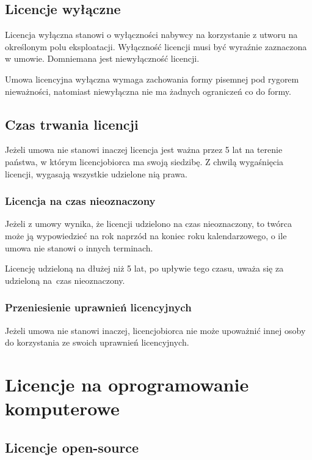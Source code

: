 \documentclass{article}
\begin{document}
\subsection{Licencje wyłączne}

Licencja wyłączna stanowi o wyłączności nabywcy na korzystanie z utworu na określonym polu eksploatacji. Wyłączność licencji musi być wyraźnie zaznaczona w umowie. Domniemana jest niewyłączność licencji.

Umowa licencyjna wyłączna wymaga zachowania formy pisemnej pod rygorem nieważności, natomiast niewyłączna nie ma żadnych ograniczeń co do formy.

\subsection{Czas trwania licencji}

Jeżeli umowa nie stanowi inaczej licencja jest ważna przez 5 lat na terenie państwa, w którym licencjobiorca ma swoją siedzibę. Z chwilą wygaśnięcia licencji, wygasają wszystkie udzielone nią prawa.

\subsubsection{Licencja na czas nieoznaczony}

Jeżeli z umowy wynika, że licencji udzielono na czas nieoznaczony, to twórca może ją wypowiedzieć na rok naprzód na koniec roku kalendarzowego, o ile umowa nie stanowi o innych terminach.

Licencję udzieloną na dłużej niż 5 lat, po upływie tego czasu, uważa się za udzieloną na~czas nieoznaczony.

\subsubsection{Przeniesienie uprawnień licencyjnych}

Jeżeli umowa nie stanowi inaczej, licencjobiorca nie może upoważnić innej osoby do korzystania ze swoich uprawnień licencyjnych.

\newpage

\section{Licencje na oprogramowanie komputerowe}

\subsection{Licencje open-source}
\end{document}
